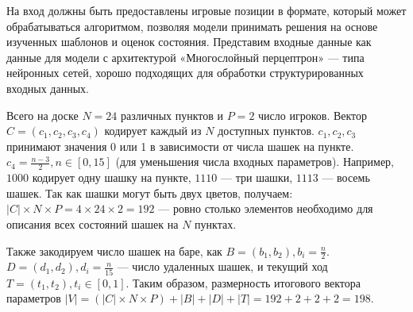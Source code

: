 На вход должны быть предоставлены игровые позиции в формате, который может обрабатываться алгоритмом, позволяя модели принимать решения на основе изученных шаблонов и оценок состояния. Представим входные данные как данные для модели с архитектурой «Многослойный перцептрон» — типа нейронных сетей, хорошо подходящих для обработки структурированных входных данных.

Всего на доске $N = 24$ различных пунктов и $P = 2$ число игроков. Вектор $C = (c_1, c_2, c_3, c_4)$ кодирует каждый из $N$ доступных пунктов. $c_1, c_2, c_3$ принимают значения 0 или 1 в зависимости от числа шашек на пункте. $c_4 = \frac{n - 3}{2}, n \in [0, 15]$ (для уменьшения числа входных параметров). Например, $1000$ кодирует одну шашку на пункте, $1110$ — три шашки, $1113$ — восемь шашек. Так как шашки могут быть двух цветов, получаем: $|C| \times N \times P = 4 \times 24 \times 2 = 192$ — ровно столько элементов необходимо для описания всех состояний шашек на $N$ пунктах.

Также закодируем число шашек на баре, как $B = (b_1, b_2), b_i = \frac{n}{2}$. $D = (d_1, d_2), d_i = \frac{n}{15}$ --- число удаленных шашек, и текущий ход $T = (t_1, t_2), t_i \in [0, 1]$. Таким образом, размерность итогового вектора параметров $|V| = (|C| \times N \times P) + |B| + |D| + |T| = 192 + 2 + 2 + 2 = 198$.
